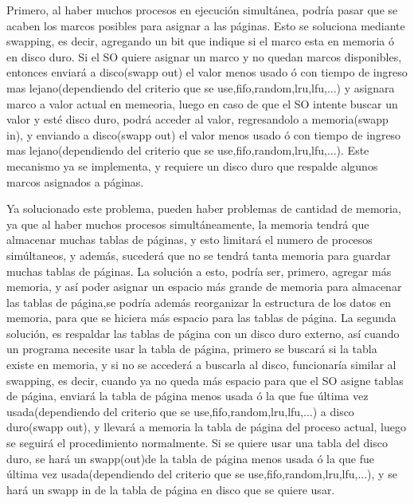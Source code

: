 \documentclass[letter]{article}
\begin{document}
	\begin{pregunta}{3}
	Primero, al haber muchos procesos en ejecución simultánea, podría pasar que se acaben los marcos posibles para asignar a las páginas. Esto se soluciona mediante swapping, es decir, agregando un bit que indique si el marco esta en memoria ó en disco duro. Si el SO quiere asignar un marco y no quedan marcos disponibles, entonces enviará a disco(swapp out) el valor menos usado ó con tiempo de ingreso mas lejano(dependiendo del criterio que se use,fifo,random,lru,lfu,...) y asignara marco a valor actual en memeoria, luego en caso de que el SO intente buscar un valor y  esté disco duro, podrá acceder al valor, regresandolo a memoria(swapp in), y enviando a disco(swapp out) el valor menos usado ó con tiempo de ingreso mas lejano(dependiendo del criterio que se use,fifo,random,lru,lfu,...). Este mecanismo ya se implementa, y requiere un disco duro que respalde algunos marcos asignados a páginas.
	
	Ya solucionado este problema, pueden haber problemas de cantidad de memoria, ya que al haber muchos procesos simultáneamente, la memoria tendrá que almacenar muchas tablas de páginas, y esto limitará el numero de procesos simúltaneos, y además, sucederá que no se tendrá tanta memoria para guardar muchas tablas de páginas. La solución a esto, podría ser, primero, agregar más memoria, y así poder asignar un espacio más grande de memoria para almacenar las tablas de página,se podría además reorganizar la estructura de los datos en memoria, para que se hiciera más espacio para las tablas de página. La segunda solución, es respaldar las tablas de página con un disco duro externo, así cuando un programa necesite usar la tabla de página, primero se buscará si la tabla existe en memoria, y si no se accederá a buscarla al disco, funcionaría similar al swapping, es decir, cuando ya no queda más espacio para que el SO asigne tablas de página, enviará la tabla de página menos usada ó la que fue última vez usada(dependiendo del criterio que se use,fifo,random,lru,lfu,...) a disco duro(swapp out), y llevará a memoria la tabla de página del proceso actual, luego se seguirá el procedimiento normalmente. Si se quiere usar una tabla del disco duro, se hará un swapp(out)de la tabla de página menos usada ó la que fue última vez usada(dependiendo del criterio que se use,fifo,random,lru,lfu,...), y se hará un swapp in de la tabla de página en disco que se quiere usar.
	
	
	

	
	
	
	


    
	\end{pregunta}
	
\end{document}
